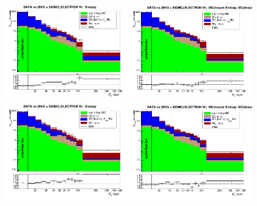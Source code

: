 \begin{figure}[htb]
  \begin{center}
   \includegraphics[width=0.48\textwidth]{../figs/figs_v11/ELECTRON_WGamma/PrepareYields/c_DATAvsBkgPlusSigMCc_ELECTRON_WGamma_TEMPL_CHISO_UNblind__Endcap__phoEt.png}\includegraphics[width=0.48\textwidth]{../figs/figs_v11/ELECTRON_WGamma/PrepareYields/c_DATAvsBkgPlusSigMCc_ELECTRON_WGamma_TEMPL_CHISO_UNblind_MCclosure__Endcap__phoEt_MCclosure.png}\\
   \includegraphics[width=0.48\textwidth]{../figs/figs_v11/ELECTRON_WGamma/PrepareYields/c_DATAvsBkgPlusSigMCc_ELECTRON_WGamma_TEMPL_SIHIH_UNblind__Endcap__phoEt.png}\includegraphics[width=0.48\textwidth]{../figs/figs_v11/ELECTRON_WGamma/PrepareYields/c_DATAvsBkgPlusSigMCc_ELECTRON_WGamma_TEMPL_SIHIH_UNblind_MCclosure__Endcap__phoEt_MCclosure.png}

\end{center}
\end{figure}
